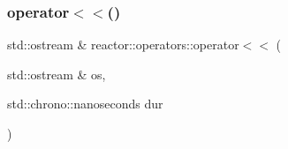 \mbox{\label{namespacereactor_1_1operators_ac12faa5aad6eda9a53865201264ea257}} 
\subsubsection{\texorpdfstring{operator$<$$<$()}{operator<<()}\hspace{0.1cm}{\footnotesize\ttfamily [5/5]}}
{\footnotesize\ttfamily std\+::ostream \& reactor\+::operators\+::operator$<$$<$ (\begin{DoxyParamCaption}\item[{std\+::ostream \&}]{os,  }\item[{std\+::chrono\+::nanoseconds}]{dur }\end{DoxyParamCaption})}

